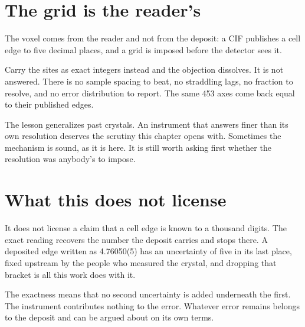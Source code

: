 \section{The grid is the reader's}

The voxel comes from the reader and not from the deposit: a CIF publishes a cell edge to five decimal places, and a grid is imposed before the detector sees it.

Carry the sites as exact integers instead and the objection dissolves. It is not answered. There is no sample spacing to beat, no straddling lags, no fraction to resolve, and no error distribution to report. The same 453 axes come back equal to their published edges.

The lesson generalizes past crystals. An instrument that answers finer than its own resolution deserves the scrutiny this chapter opens with. Sometimes the mechanism is sound, as it is here. It is still worth asking first whether the resolution was anybody's to impose.

\section{What this does not license}

It does not license a claim that a cell edge is known to a thousand digits. The exact reading recovers the number the deposit carries and stops there. A deposited edge written as 4.76050(5) has an uncertainty of five in its last place, fixed upstream by the people who measured the crystal, and dropping that bracket is all this work does with it.

The exactness means that no second uncertainty is added underneath the first. The instrument contributes nothing to the error. Whatever error remains belongs to the deposit and can be argued about on its own terms.
